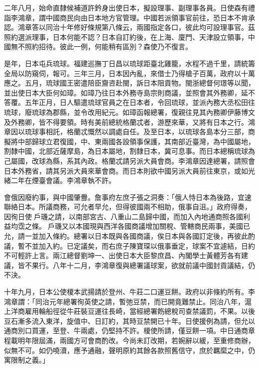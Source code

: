 \begin{pinyinscope}
二年八月，始命直隸候補道許鈐身出使日本，擬設理事、副理事各員。日使森有禮詣李鴻章，謂中國商民向由日本地方官管理。中國若派領事官前往，恐日本不肯承認。鴻章答以同治十年修好條規第八條云，兩國指定各口，彼此均可設理事官。茲照約選派理事，日本何能不認？日本自訂約後，在上海、廈門、天津設立領事，中國無不照約招待。彼此一例，何能稍有區別？森使乃不復言。

是年，日本屯兵琉球。福建巡撫丁日昌以琉球距臺北雞籠，水程不過千里，請統籌全局以防窺伺，報可。三年三月，日本因內亂，來借士乃得槍子百萬，政府以十萬應之。五月，琉球國王密遣陪臣齎咨赴閩，訴日本阻貢物。閩浙總督何璟等以聞，並出使日本大臣何如璋。如璋乃往日本外務寺島宗則商議，並照會其外務卿，延不答覆。五年正月，日人驅遣琉球官員之在日本者，令回琉球，並派內務大丞松田往琉球，廢琉球為郡縣，並令改用紀元。如璋函報總署，復親往見其內務卿伊藤博文及外務卿，皆不得要領。時有美前總統格蘭忒者，游歷來華，又將有日本之行。鴻章因以琉球事相託，格蘭忒慨然以調處自任。及至日本，以琉球各島本分三部，商擬將中部歸球立君復國，中、東兩國各設領事保護，其南部近臺灣，為中國屬地，割隸中國，北部近薩摩島，為日本屬地，割隸日本，冀可息事。而日本總稱琉球為己屬國，改球為縣，系其內政。格蘭忒請另派大員會商。李鴻章因達總署，請照會日本外務省，請其另派大員來華會商。而日本則欲中國另派大員前往東京，或如光緒二年在煙臺會議。李鴻章執不許。

會俄因廢約事，與中國肇釁。詹事府左庶子張之洞奏：「俄人恃日本為後路，宜速聯絡日本。所議商務，可允者早允，但得彼國兩不相助，俄事自沮。」政府得奏，因徇日使戶璣之請，以南部宮古、八重山二島歸中國，而加入內地通商照各國利益均霑之條。戶璣又以本國現與西洋各國商議增加關稅、管轄商民兩事，美國已允，請一並加入條約。總署以日本既與各國商議，俟日本與各國訂定後，再彼此酌議，暫不並加入約。已定議矣，而右庶子陳寶琛以俄事垂定，球案不宜遽結，日約不可輕許上言。兩江總督劉坤一、出使日本大臣黎庶昌、內閣學士黃體芳各有建議，皆不果行。八年十二月，李鴻章復與總署議球案，欲就前議中國封貢議結，仍不決。

十年九月，日本公使榎本武揚請於登州、牛莊二口運豆餅。政府以非條約所有。李鴻章謂：「同治元年總署徇英使之請，暫弛豆禁，而已開竟難禁止。同治八年，滬上洋商雇用輪船徑從牛莊裝豆運往長崎，當經總署飭總稅司查禁議罰，不果。以後豆石漸多流入東洋，旋值中、日訂約，其時豆禁開已十年。日使援例為請，但允以通商別口買運，至登、牛兩處，仍堅持不許。榎使所請，僅豆餅一項。中日通商章程載明年限屆滿，兩國方可會商酌改。今尚未訂改期，若婉辭以緩，至重修商辦，似無不可。如仍嘵瀆，應予通融，聲明原約其餘各款照舊信守，庶於羈縻之中，仍寓限制之義。」


\end{pinyinscope}
